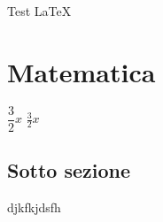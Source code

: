 \documentclass{article}
\begin{document}
Test \LaTeX


\section{Matematica}

$\dfrac{3}{2}x$ $\frac{3}{2}x$


\subsection{Sotto sezione}

djkfkjdsfh

\end{document}
